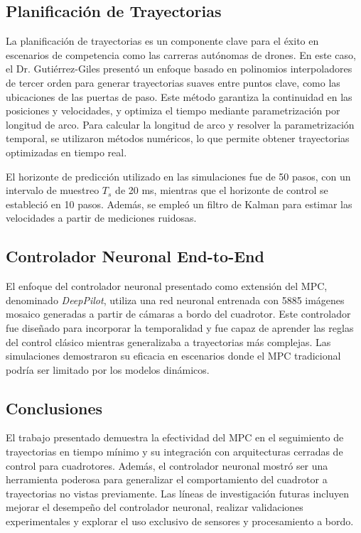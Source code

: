 \documentclass[conference]{IEEEtran}
\begin{document}
\subsection*{Planificación de Trayectorias}

La planificación de trayectorias es un componente clave para el éxito en escenarios de competencia como las carreras autónomas de drones. En este caso, el Dr. Gutiérrez-Giles presentó un enfoque basado en polinomios interpoladores de tercer orden para generar trayectorias suaves entre puntos clave, como las ubicaciones de las puertas de paso. Este método garantiza la continuidad en las posiciones y velocidades, y optimiza el tiempo mediante parametrización por longitud de arco. Para calcular la longitud de arco y resolver la parametrización temporal, se utilizaron métodos numéricos, lo que permite obtener trayectorias optimizadas en tiempo real.

El horizonte de predicción utilizado en las simulaciones fue de 50 pasos, con un intervalo de muestreo $T_s$ de 20 ms, mientras que el horizonte de control se estableció en 10 pasos. Además, se empleó un filtro de Kalman para estimar las velocidades a partir de mediciones ruidosas.

\subsection*{Controlador Neuronal End-to-End}

El enfoque del controlador neuronal presentado como extensión del MPC, denominado \textit{DeepPilot}, utiliza una red neuronal entrenada con 5885 imágenes mosaico generadas a partir de cámaras a bordo del cuadrotor. Este controlador fue diseñado para incorporar la temporalidad y fue capaz de aprender las reglas del control clásico mientras generalizaba a trayectorias más complejas. Las simulaciones demostraron su eficacia en escenarios donde el MPC tradicional podría ser limitado por los modelos dinámicos.

\subsection*{Conclusiones}

El trabajo presentado demuestra la efectividad del MPC en el seguimiento de trayectorias en tiempo mínimo y su integración con arquitecturas cerradas de control para cuadrotores. Además, el controlador neuronal mostró ser una herramienta poderosa para generalizar el comportamiento del cuadrotor a trayectorias no vistas previamente. Las líneas de investigación futuras incluyen mejorar el desempeño del controlador neuronal, realizar validaciones experimentales y explorar el uso exclusivo de sensores y procesamiento a bordo.
\end{document}
